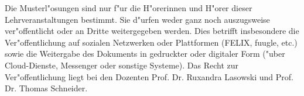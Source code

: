 \begin{titlepage}
Die Musterl"osungen sind nur f"ur die H"orerinnen und H"orer dieser Lehrveranstaltungen bestimmt. Sie d"urfen weder ganz noch auszugsweise ver"offentlicht oder an Dritte weitergegeben werden. Dies betrifft insbesondere die Ver"offentlichung auf sozialen Netzwerken oder Plattformen (FELIX, fuugle, etc.) sowie die Weitergabe des Dokuments in gedruckter oder digitaler Form ("uber Cloud-Dienste, Messenger oder sonstige Systeme). Das Recht zur Ver"offentlichung liegt bei den Dozenten Prof. Dr. Ruxandra Lasowski und Prof. Dr. Thomas Schneider.
\[   \]
\end{titlepage}
